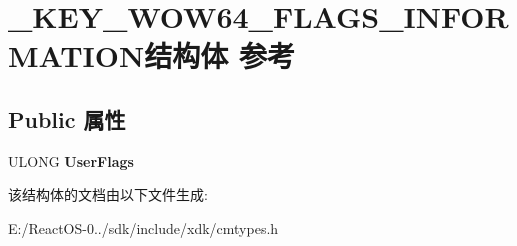 \hypertarget{struct___k_e_y___w_o_w64___f_l_a_g_s___i_n_f_o_r_m_a_t_i_o_n}{}\section{\+\_\+\+K\+E\+Y\+\_\+\+W\+O\+W64\+\_\+\+F\+L\+A\+G\+S\+\_\+\+I\+N\+F\+O\+R\+M\+A\+T\+I\+O\+N结构体 参考}
\label{struct___k_e_y___w_o_w64___f_l_a_g_s___i_n_f_o_r_m_a_t_i_o_n}
\subsection*{Public 属性}
\begin{DoxyCompactItemize}
\item 
\mbox{\label{struct___k_e_y___w_o_w64___f_l_a_g_s___i_n_f_o_r_m_a_t_i_o_n_ae8659bc8096f367ea545d42079722ab4}} 
U\+L\+O\+NG {\bfseries User\+Flags}
\end{DoxyCompactItemize}


该结构体的文档由以下文件生成\+:\begin{DoxyCompactItemize}
\item 
E\+:/\+React\+O\+S-\/0../sdk/include/xdk/cmtypes.\+h\end{DoxyCompactItemize}

